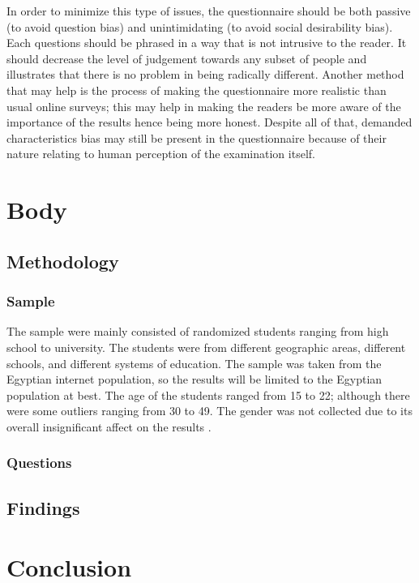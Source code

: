 \documentclass[12pt]{report}
\begin{document}
In order to minimize this type of issues, the questionnaire should be both
passive (to avoid question bias) and unintimidating (to avoid social
desirability bias). Each questions should be phrased in a way that is not
intrusive to the reader. It should decrease the level of judgement towards any
subset of people and illustrates that there is no problem in being radically
different. Another method that may help is the process of making the
questionnaire more realistic than usual online surveys; this may help in making
the readers be more aware of the importance of the results hence being more
honest. Despite all of that, demanded characteristics bias may still be present
in the questionnaire because of their nature relating to human perception of the
examination itself.

\chapter{Body}
\section{Methodology}

\subsection{Sample}

The sample were mainly consisted of randomized students ranging from high school
to university. The students were from different geographic areas, different
schools, and different systems of education. The sample was taken from the
Egyptian internet population, so the results will be limited to the Egyptian
population at best. The age of the students ranged from 15 to 22; although there
were some outliers ranging from 30 to 49. The gender was not collected due to
its overall insignificant affect on the results \parencite{hashmat2008factors}.

\subsection{Questions}

\section{Findings}

\lipsum

\chapter{Conclusion}
\end{document}
